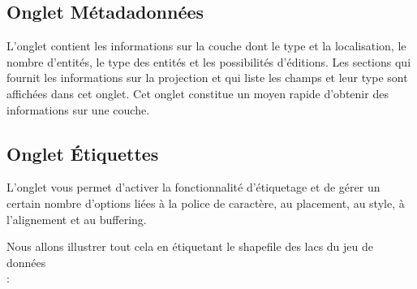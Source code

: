 \subsection{Onglet Métadadonnées}

L'onglet  contient les informations sur la couche dont le type et la localisation, le nombre d'entités, le type des entités et les possibilités d'éditions. Les sections  qui fournit les informations sur la projection et  qui liste les champs et leur type sont affichées dans cet onglet. Cet onglet constitue un moyen rapide d'obtenir des informations sur une couche.

\subsection{Onglet Étiquettes}

L'onglet  vous permet d'activer la fonctionnalité d'étiquetage et de gérer un certain nombre d'options liées à la police de caractère, au placement, au style, à l'alignement et au buffering.

Nous allons illustrer tout cela en étiquetant le shapefile des lacs du jeu de données\\  :

